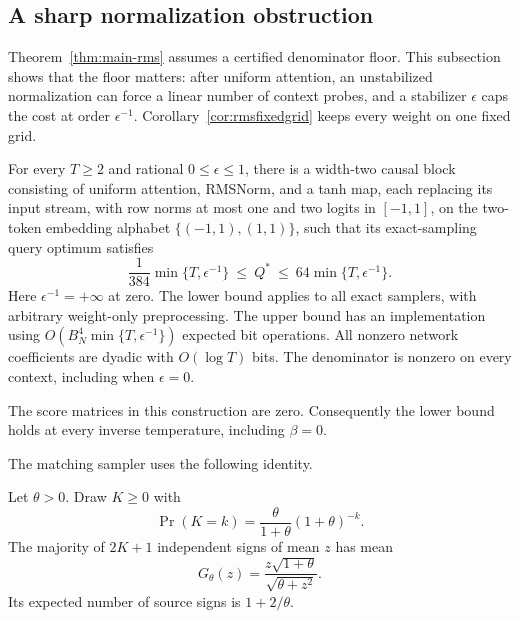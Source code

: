 \subsection{A sharp normalization obstruction}
\label{sec:rms-obstruction}

Theorem~\ref{thm:main-rms} assumes a certified denominator floor.
This subsection shows that the floor matters: after uniform attention,
an unstabilized normalization can force a linear number of context
probes, and a stabilizer $\epsilon$ caps the cost at order
$\epsilon^{-1}$. Corollary~\ref{cor:rmsfixedgrid} keeps every weight
on one fixed grid.

\begin{theorem}
\label{thm:rmscontextlaw}
For every $T\ge2$ and rational $0\le\epsilon\le1$, there is a
width-two causal block consisting of uniform attention, RMSNorm,
and a tanh map, each replacing its input stream, with row norms at
most one and two logits
in $[-1,1]$, on the two-token embedding alphabet
$\{(-1,1),(1,1)\}$, such that its exact-sampling query optimum satisfies
\begin{equation}
 \frac1{384}\min\{T,\epsilon^{-1}\}
 \ \le\ Q^*\ \le\
 64\min\{T,\epsilon^{-1}\}.
 \label{eq:rmscontextlaw}
\end{equation}
Here $\epsilon^{-1}=+\infty$ at zero. The lower bound applies to all
exact samplers, with arbitrary weight-only preprocessing. The upper
bound has an implementation using
$O(B_N^4\min\{T,\epsilon^{-1}\})$ expected bit operations.
All nonzero network coefficients are dyadic with
$O(\log T)$ bits. The denominator is nonzero on every context,
including when $\epsilon=0$.
\end{theorem}

The score matrices in this construction are zero. Consequently the
lower bound holds at every inverse temperature, including $\beta=0$.

The matching sampler uses the following identity.

\begin{lemma}
\label{lem:rmsgeommajority}
Let $\theta>0$. Draw $K\ge0$ with
\[
 \Pr(K=k)=\frac\theta{1+\theta}(1+\theta)^{-k}.
\]
The majority of $2K+1$ independent signs of mean $z$ has mean
\begin{equation}
 G_\theta(z)=\frac{z\sqrt{1+\theta}}{\sqrt{\theta+z^2}}.
 \label{eq:rmsgeommajority}
\end{equation}
Its expected number of source signs is $1+2/\theta$.
\end{lemma}
